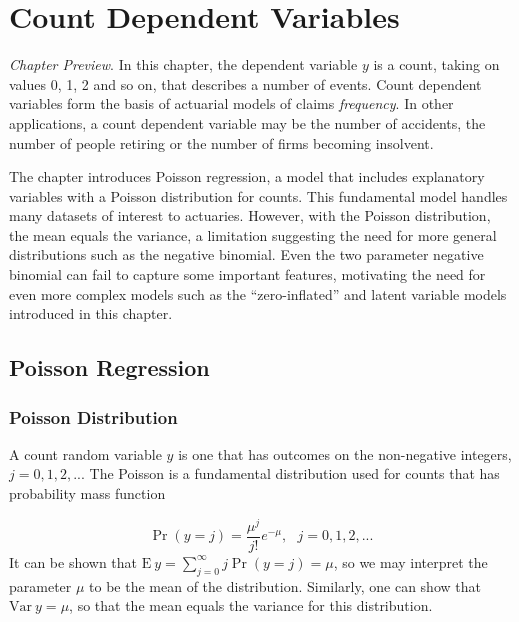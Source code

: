 \setcounter{chapter}{11}

\chapter{Count Dependent Variables}


{\small \textit{Chapter Preview}. In this chapter, the dependent
variable $y$ is a count, taking on values 0, 1, 2 and so on, that
describes a number of events. Count dependent variables form the
basis of actuarial models of claims \emph{frequency}. In other
applications, a count dependent variable may be the number of
accidents, the number of people retiring or the number of firms
becoming insolvent.}

{\small The chapter introduces Poisson regression, a model that
includes explanatory variables with a Poisson distribution for
counts. This fundamental model handles many datasets of interest to
actuaries. However, with the Poisson distribution, the mean equals
the variance, a limitation suggesting the need for more general
distributions such as the negative binomial. Even the two parameter
negative binomial can fail to capture some important features,
motivating the need for even more complex models such as the
``zero-inflated'' and latent variable models introduced in this
chapter.}


\section{Poisson Regression}

\subsection{Poisson Distribution}

A count random variable $y$ is one that has outcomes on the
non-negative integers, $j=0,1,2,...$ The Poisson is a fundamental
distribution used for counts that has probability mass function

\begin{equation}\label{E12:PoissonDist}
\Pr \left( y=j\right) =\frac{\mu^j}{j!}e^{-\mu },~~~j=0,1,2,...
\end{equation}
It can be shown that $\mathrm{E~} y =\sum\nolimits_{j=0}^{\infty
}j\Pr \left( y=j\right) =\mu $, so we may interpret the parameter
$\mu $ to be the mean of the distribution. Similarly, one can show
that $\mathrm{Var~}y =\mu $, so that the mean equals the variance
for this distribution.


